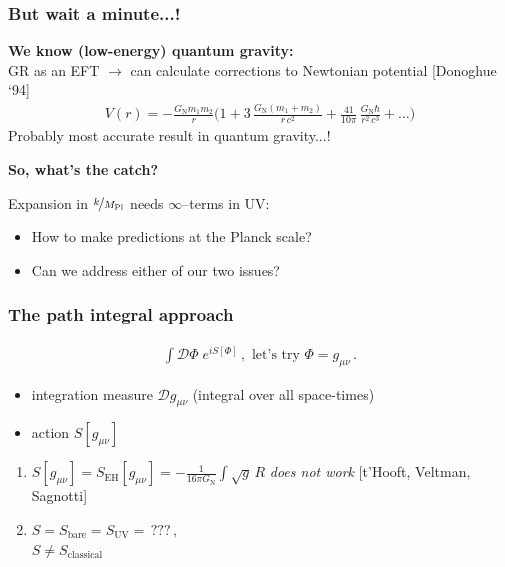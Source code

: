 \documentclass[]{beamer}  %
\newcommand\GNewton{ G_{\scriptscriptstyle{\mathrm{N}}}{} }
\newcommand\SEH{ S_{\scriptscriptstyle{\mathrm{EH}}}{} }
\newcommand\SUV{ S_{\scriptscriptstyle{\mathrm{UV}}}{} }
\newcommand\Sbare{ S_{\scriptscriptstyle{\mathrm{bare}}}{} }
\newcommand\Sclass{ S_{\scriptscriptstyle{\mathrm{classical}}}{} }
\newcommand\MPl{ M_{\scriptscriptstyle{\mathrm{Pl}}}{} }
\newcommand\metric{ g_{\mu\nu} }
\begin{document}
\addtocounter{framenumber}{-1}
\begin{frame}
  \frametitle{But wait a minute...!}
  \textbf{We know (low-energy) quantum gravity:}\\[5pt]
  GR as an EFT $\rightarrow$ can calculate corrections to Newtonian potential [Donoghue `94]
  \begin{align*}
    \boxed{
      V(r) = -\frac{\GNewton m_1 m_2}{r}
      \bigg(
        1
        + 3 \, \frac{\GNewton (m_1 + m_2)}{r \, c^2}
        + \frac{41}{10 \pi} \, \frac{\GNewton \hbar}{r^2 \, c^3}
        + \dots
      \bigg)
    }
  \end{align*}
  \hfill Probably most accurate result in quantum gravity...!
  \pause
  \vfill
  \begin{center}
    \fontsize{12pt}{7.2}\selectfont
    \textbf{ So, what's the catch? }
  \end{center}
  \pause
  \vspace{10pt}
  Expansion in $\nicefrac{k}{\MPl}$ needs $\infty$--terms in UV:\\[5pt]
  \begin{itemize}
    \item How to make predictions at the Planck scale?\\[5pt]
    \item Can we address either of our two issues?
  \end{itemize}
\end{frame}



\begin{frame}
  \frametitle{The path integral approach}
  \begin{align*}
    \boxed{
    \int \mathcal D \Phi \; e^{i S[\Phi]}\,,
    \text{ let's try } \Phi = \metric \,.
    }
  \end{align*}
  \vfill
  \begin{itemize}
    \item integration measure $\mathcal D \metric$ (integral over all space-times)
    \item action $S[\metric]$
  \end{itemize}
  \vfill
  \begin{enumerate}
    \item $S[\metric] = \SEH[\metric] = - \frac{1}{16 \pi \GNewton} \int \sqrt{g} \, R$
      \hspace{2pt}
      \textit{does not work} [t'Hooft, Veltman, Sagnotti]\\[15pt]
    \item $S = \Sbare = \SUV = \, ???\,,$\\[5pt]
          $S \neq \Sclass$
  \end{enumerate}
\end{frame}
\end{document}
